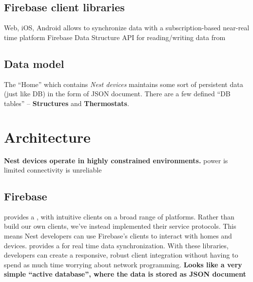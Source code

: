 \documentclass{myproc}
\begin{document}
\subsection{Firebase client libraries}
\bit
\w Web, iOS, Android
\w allows to synchronize data with a subscription-based 
    near-real time platform
\w Firebase Data Structure
\w API for reading/writing data from 
\eit

\subsection{Data model}
The ``Home'' which contains {\em Nest devices\/} maintains some sort of
persistent data (just like DB) in the form of JSON document.
There are a few defined ``DB tables'' -- \textcolor{blue2}{\bf{}Structures}
and \textcolor{blue2}{\bf{}Thermostats}.

\section{Architecture}
\bit
\w \textcolor{red2}{\bf{}Nest devices operate in highly constrained
  environments.}
   \bit
   \w  power is limited
   \w connectivity is unreliable
   \eit
\eit

\subsection{Firebase}
\bit
\w provides a , with intuitive
clients on a broad range of platforms. Rather than build our own clients,
we've instead implemented their service protocols. This means Nest developers
can use Firebase's clients to interact with homes and devices. 
\w provides a  for real time data synchronization. With
these libraries, developers can create a responsive, robust client integration
without having to spend as much time worrying about network programming. 
\w \textcolor{blue2}{\bf{}Looks like a very simple ``active database'', where
  the data is stored as JSON document}
\eit
\end{document}
